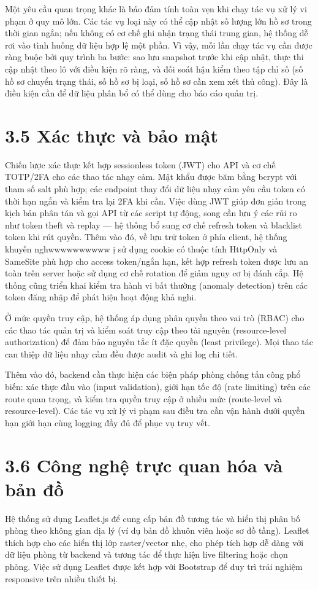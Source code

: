 Một yêu cầu quan trọng khác là bảo đảm tính toàn vẹn khi chạy tác vụ xử lý vi phạm ở quy mô lớn. Các tác vụ loại này có thể cập nhật số lượng lớn hồ sơ trong thời gian ngắn; nếu không có cơ chế ghi nhận trạng thái trung gian, hệ thống dễ rơi vào tình huống dữ liệu hợp lệ một phần. Vì vậy, mỗi lần chạy tác vụ cần được ràng buộc bởi quy trình ba bước: sao lưu snapshot trước khi cập nhật, thực thi cập nhật theo lô với điều kiện rõ ràng, và đối soát hậu kiểm theo tập chỉ số (số hồ sơ chuyển trạng thái, số hồ sơ bị loại, số hồ sơ cần xem xét thủ công). Đây là điều kiện cần để dữ liệu phân bổ có thể dùng cho báo cáo quản trị.

\section*{3.5 Xác thực và bảo mật}
Chiến lược xác thực kết hợp sessionless token (JWT) cho API và cơ chế TOTP/2FA cho các thao tác nhạy cảm. Mật khẩu được băm bằng bcrypt với tham số salt phù hợp; các endpoint thay đổi dữ liệu nhạy cảm yêu cầu token có thời hạn ngắn và kiểm tra lại 2FA khi cần. Việc dùng JWT giúp đơn giản trong kịch bản phân tán và gọi API từ các script tự động, song cần lưu ý các rủi ro như token theft và replay — hệ thống bổ sung cơ chế refresh token và blacklist token khi rút quyền.
Thêm vào đó, về lưu trữ token ở phía client, hệ thống khuyến nghwwwwwwwwww
ị sử dụng cookie có thuộc tính HttpOnly và SameSite phù hợp cho access token/ngắn hạn, kết hợp refresh token được lưu an toàn trên server hoặc sử dụng cơ chế rotation để giảm nguy cơ bị đánh cắp. Hệ thống cũng triển khai kiểm tra hành vi bất thường (anomaly detection) trên các token đăng nhập để phát hiện hoạt động khả nghi.

Ở mức quyền truy cập, hệ thống áp dụng phân quyền theo vai trò (RBAC) cho các thao tác quản trị và kiểm soát truy cập theo tài nguyên (resource-level authorization) để đảm bảo nguyên tắc ít đặc quyền (least privilege). Mọi thao tác can thiệp dữ liệu nhạy cảm đều được audit và ghi log chi tiết.

Thêm vào đó, backend cần thực hiện các biện pháp phòng chống tấn công phổ biến: xác thực đầu vào (input validation), giới hạn tốc độ (rate limiting) trên các route quan trọng, và kiểm tra quyền truy cập ở nhiều mức (route-level và resource-level). Các tác vụ xử lý vi phạm sau điều tra cần vận hành dưới quyền hạn giới hạn cùng logging đầy đủ để phục vụ truy vết.

\section*{3.6 Công nghệ trực quan hóa và bản đồ}
Hệ thống sử dụng Leaflet.js để cung cấp bản đồ tương tác và hiển thị phân bố phòng theo không gian địa lý (ví dụ bản đồ khuôn viên hoặc sơ đồ tầng). Leaflet thích hợp cho các hiển thị lớp raster/vector nhẹ, cho phép tích hợp dễ dàng với dữ liệu phòng từ backend và tương tác để thực hiện live filtering hoặc chọn phòng. Việc sử dụng Leaflet được kết hợp với Bootstrap để duy trì trải nghiệm responsive trên nhiều thiết bị.

